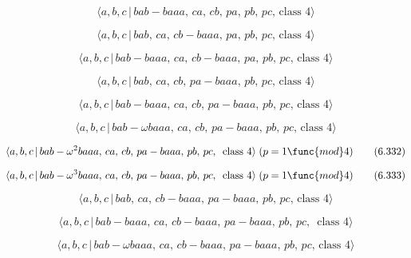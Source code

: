 \documentclass[10pt]{article}
\begin{document}
\begin{equation}
\langle a,b,c\,|\,bab-baaa,\,ca,\,cb,\,pa,\,pb,\,pc,\,\text{class }4\rangle 
\tag{6.326}
\end{equation}

\begin{equation}
\langle a,b,c\,|\,bab,\,ca,\,cb-baaa,\,pa,\,pb,\,pc,\,\text{class }4\rangle 
\tag{6.327}
\end{equation}

\begin{equation}
\langle a,b,c\,|\,bab-baaa,\,ca,\,cb-baaa,\,pa,\,pb,\,pc,\,\text{class }%
4\rangle  \tag{6.328}
\end{equation}

\begin{equation}
\langle a,b,c\,|\,bab,\,ca,\,cb,\,pa-baaa,\,pb,\,pc,\,\text{class }4\rangle 
\tag{6.329}
\end{equation}

\begin{equation}
\langle a,b,c\,|\,bab-baaa,\,ca,\,cb,\,pa-baaa,\,pb,\,pc,\,\text{class }%
4\rangle  \tag{6.330}
\end{equation}

\begin{equation}
\langle a,b,c\,|\,bab-\omega baaa,\,ca,\,cb,\,pa-baaa,\,pb,\,pc,\,\text{
class }4\rangle  \tag{6.331}
\end{equation}

\begin{equation}
\langle a,b,c\,|\,bab-\omega ^2baaa,\,ca,\,cb,\,pa-baaa,\,pb,\,pc,\,\text{
class }4\rangle\;(p=1 \func{mod} 4)  \tag{6.332}
\end{equation}

\begin{equation}
\langle a,b,c\,|\,bab-\omega ^3baaa,\,ca,\,cb,\,pa-baaa,\,pb,\,pc,\,\text{
class }4\rangle\;(p=1 \func{mod} 4)  \tag{6.333}
\end{equation}

\begin{equation}
\langle a,b,c\,|\,bab,\,ca,\,cb-baaa,\,pa-baaa,\,pb,\,pc,\,\text{class }%
4\rangle  \tag{6.334}
\end{equation}

\begin{equation}
\langle a,b,c\,|\,bab-baaa,\,ca,\,cb-baaa,\,pa-baaa,\,pb,\,pc,\,\text{ class 
}4\rangle  \tag{6.335}
\end{equation}

\begin{equation}
\langle a,b,c\,|\,bab-\omega baaa,\,ca,\,cb-baaa,\,pa-baaa,\,pb,\,pc,\,\text{
class }4\rangle  \tag{6.336}
\end{equation}
\end{document}
